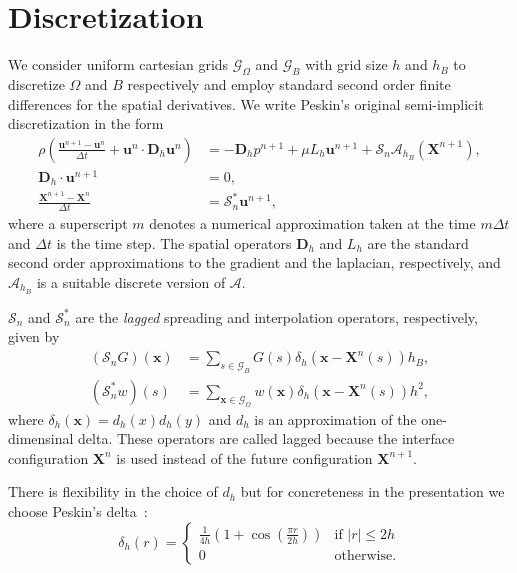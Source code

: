 \documentclass[preprint,12pt]{elsarticle}
\begin{document}
\section{Discretization}
\label{Sec:discretization}
We consider uniform cartesian grids $\mathcal{G}_\Omega$  and $\mathcal{G}_B$ with grid size $h$ and $h_B$
to discretize $\Omega$ and $B$ respectively and employ standard second order finite differences for the spatial derivatives.  We write Peskin's original semi-implicit discretization in the form
\begin{align}
\rho\left(\frac{\mathbf{u}^{n+1}-\mathbf{u}^n}{\Delta t} + \mathbf{u}^n\cdot\mathbf{D}_h\mathbf{u}^n\right) &= -\mathbf{D}_h p^{n+1}+ \mu L_h \mathbf{u}^{n+1} + \mathcal{S}_n\mathcal{A}_{h_B}(\mathbf{X}^{n+1}), \label{eq:dmoment} \\
\mathbf{D}_h \cdot \mathbf{u}^{n+1} &= 0, \label{eq:ddivergence} \\
\frac{\mathbf{X}^{n+1}-\mathbf{X}^n}{\Delta t} &= \mathcal{S}^*_n\mathbf{u}^{n+1}, \label{eq:Xt}
\end{align}
where a superscript  $m$ denotes a numerical approximation taken at the time $m \Delta t$ and $\Delta t$ is the time step. The spatial operators $\mathbf{D}_h$ and $L_h$ are the standard second order approximations to the gradient and the laplacian, respectively,  and $\mathcal{A}_{h_B}$ is a suitable discrete version of $\mathcal{A}$. 

  $ \mathcal{S}_n$ and $ \mathcal{S}^*_n$ are the  {\em lagged} spreading and interpolation operators, respectively,  given by
\begin{align}
(\mathcal{S}_n G) (\mathbf{x})&= \sum_{s \in \mathcal{G}_B }G(s) \delta_h(\mathbf{x}-\mathbf{X}^n(s))h_B,
\label{eq:S} \\
(\mathcal{S}^*_n w)(s) &= \sum_{ \mathbf{x} \in \mathcal{G}_\Omega} w(\mathbf{x})\delta_h(\mathbf{x}-\mathbf{X}^n(s))h^2,
\label{eq:S*}
\end{align}
where $\delta_h(\mathbf{x}) = d_h(x)d_h(y)$ and $d_h$ is an approximation of the one-dimensinal delta. 
These operators are called lagged because the interface configuration $\mathbf{X}^n$ is used 
instead of the future configuration $\mathbf{X}^{n+1}$.

There is flexibility in the choice of $d_h$ but for concreteness in the presentation we choose Peskin's 
delta~\cite{Peskin77}:
\begin{equation}
\delta_h(r) = \begin{cases}
\frac{1}{4h}\left( 1+\cos(\frac{\pi r}{2h})\right)& \textrm{if } |r|\leq 2h \\
0& \textrm{otherwise}.
\end{cases}
\end{equation}
\end{document}

